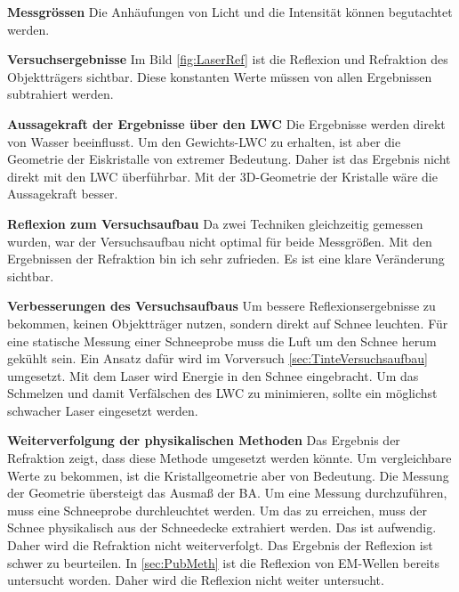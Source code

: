 \textbf{Messgrössen}
Die Anhäufungen von Licht und die Intensität können begutachtet werden.

\textbf{Versuchsergebnisse}
Im Bild \ref{fig:LaserRef} ist die Reflexion und Refraktion des Objektträgers sichtbar. Diese konstanten Werte müssen von allen Ergebnissen subtrahiert werden.








\textbf{Aussagekraft der Ergebnisse über den LWC}
Die Ergebnisse werden direkt von Wasser beeinflusst. Um den Gewichts-LWC zu erhalten, ist aber die Geometrie der Eiskristalle von extremer Bedeutung. Daher ist das Ergebnis nicht direkt mit den LWC überführbar. Mit der 3D-Geometrie der Kristalle wäre die Aussagekraft besser.

\textbf{Reflexion zum Versuchsaufbau}
Da zwei Techniken gleichzeitig gemessen wurden, war der Versuchsaufbau nicht optimal für beide Messgrößen. Mit den Ergebnissen der Refraktion bin ich sehr zufrieden. Es ist eine klare Veränderung sichtbar.

\textbf{Verbesserungen des Versuchsaufbaus}
Um bessere Reflexionsergebnisse zu bekommen, keinen Objektträger nutzen, sondern direkt auf Schnee leuchten. Für eine statische Messung einer Schneeprobe muss die Luft um den Schnee herum gekühlt sein. Ein Ansatz dafür wird im Vorversuch \ref{sec:TinteVersuchsaufbau} umgesetzt. Mit dem Laser wird Energie in den Schnee eingebracht. Um das Schmelzen und damit Verfälschen des LWC zu minimieren, sollte ein möglichst schwacher Laser eingesetzt werden.

\textbf{Weiterverfolgung der physikalischen Methoden}
Das Ergebnis der Refraktion zeigt, dass diese Methode umgesetzt werden könnte. Um vergleichbare Werte zu bekommen, ist die Kristallgeometrie aber von Bedeutung. Die Messung der Geometrie übersteigt das Ausmaß der BA. Um eine Messung durchzuführen, muss eine Schneeprobe durchleuchtet werden. Um das zu erreichen, muss der Schnee physikalisch aus der Schneedecke extrahiert werden. Das ist aufwendig. Daher wird die Refraktion nicht weiterverfolgt. Das Ergebnis der Reflexion ist schwer zu beurteilen. In \ref{sec:PubMeth} ist die Reflexion von EM-Wellen bereits untersucht worden. Daher wird die Reflexion nicht weiter untersucht.
